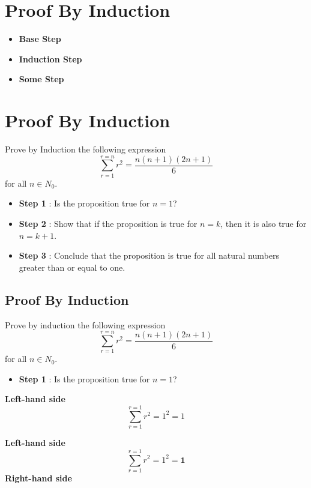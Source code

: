 
\section*{Proof By Induction}

\begin{itemize}
\item \textbf{Base Step}
\item \textbf{Induction Step}
\item \textbf{Some Step}
\end{itemize}




\section{Proof By Induction}

Prove by Induction the following expression
\[ \sum_{r=1}^{r=n} r^2 = \frac{n(n+1)(2n+1)}{6} \]
for all $n \in N_0$.


\begin{itemize}
	\item \textbf{Step 1} : Is the proposition true for $n = 1$?
	\item \textbf{Step 2} : Show that if the proposition is true for $n=k$, then it is also true for $n=k+1$.
	\item \textbf{Step 3} : Conclude that the proposition is true for all natural numbers greater than or equal to one.
\end{itemize}


\subsection{Proof By Induction}

Prove by induction the following expression
\[ \sum_{r=1}^{r=n} r^2 = \frac{n(n+1)(2n+1)}{6} \]
for all $n \in N_0$.
\begin{itemize}
	\item \textbf{Step 1} : Is the proposition true for $n = 1$? 
\end{itemize}
\textbf{Left-hand side}
\[ \sum_{r=1}^{r=1} r^2 = 1^2 = 1 \]



\textbf{Left-hand side}
\[ \sum_{r=1}^{r=1} r^2 = 1^2 = \boldsymbol{1} \]
\textbf{Right-hand side}

